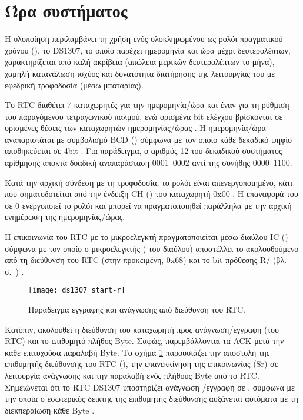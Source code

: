 \section{Ώρα συστήματος}
\label{sec:rtc}

Η υλοποίηση περιλαμβάνει τη χρήση ενός ολοκληρωμένου ως ρολόι πραγματικού χρόνου
(), το DS1307, το οποίο παρέχει ημερομηνία και ώρα
μέχρι δευτερολέπτων, χαρακτηρίζεται από καλή ακρίβεια (απώλεια μερικών
δευτερολέπτων το μήνα), χαμηλή κατανάλωση ισχύος και δυνατότητα διατήρησης της
λειτουργίας του με εφεδρική τροφοδοσία (μέσω μπαταρίας).

Το RTC διαθέτει 7 καταχωρητές για την ημερομηνία\slash{}ώρα και έναν για τη
ρύθμιση του παραγόμενου τετραγωνικού παλμού, ενώ ορισμένα bit ελέγχου βρίσκονται
σε ορισμένες θέσεις των καταχωρητών ημερομηνίας\slash{}ώρας
\parencite[8]{ds1307}. Η ημερομηνία\slash{}ώρα
αναπαριστάται με συμβολισμό BCD () σύμφωνα με
τον οποίο κάθε δεκαδικό ψηφίο αποθηκεύεται σε 4bit \parencite[8]{ds1307}.
Για παράδειγμα, ο αριθμός 12 του δεκαδικού συστήματος αρίθμησης αποκτά δυαδική
αναπαράσταση 0001~0002 αντί της συνήθης 0000~1100.


Κατά την αρχική σύνδεση με τη τροφοδοσία, το ρολόι είναι απενεργοποιημένο, κάτι
που σηματοδοτείται από την ένδειξη CH () του καταχωρητή 0x00
\parencite[8]{ds1307}. Η επαναφορά του σε 0 ενεργοποιεί το ρολόι και μπορεί να
πραγματοποιηθεί παράλληλα με την αρχική ενημέρωση της ημερομηνίας\slash{}ώρας.

Η επικοινωνία του RTC με το μικροελεγκτή πραγματοποιείται μέσω διαύλου
IC () σύμφωνα με τον οποίο ο μικροελεγκτής
( του διαύλου) αποστέλλει το  ακολουθούμενο από τη
διεύθυνση του RTC (στην προκειμένη, 0x68) και το bit πρόθεσης R\slash{}
(βλ.  σ.~\pageref{subsec:i2c}) \parencite[1,10]{ds1307}.

\begin{figure}
    \caption{Παράδειγμα εγγραφής και ανάγνωσης από διεύθυνση του RTC.
    \label{fig:rtc:start-r}}
    \begin{center}
    \texttt{[image: ds1307\_start-r]}
    \end{center}
\end{figure}

Κατόπιν, ακολουθεί η διεύθυνση του καταχωρητή προς ανάγνωση\slash{}εγγραφή (του
RTC) και το επιθυμητό πλήθος Byte. Σαφώς, παρεμβάλλονται τα  ACK μετά
την κάθε επιτυχούσα παραλαβή Byte. Το σχήμα \ref{fig:rtc:start-r} παρουσιάζει
την αποστολή της επιθυμητής διεύθυνσης του RTC (), την
επανεκκίνηση της επικοινωνίας (Sr) σε λειτουργία ανάγνωσης και την παραλαβή ενός
πλήθους Byte από το RTC. Σημειώνεται ότι το RTC DS1307 υποστηρίζει ανάγνωση%
\slash{}εγγραφή σε , σύμφωνα με την οποία ο εσωτερικός δείκτης
της επιθυμητής διεύθυνσης αυξάνεται αυτόματα με τη διεκπεραίωση κάθε Byte
\parencite[12]{ds1307}.


